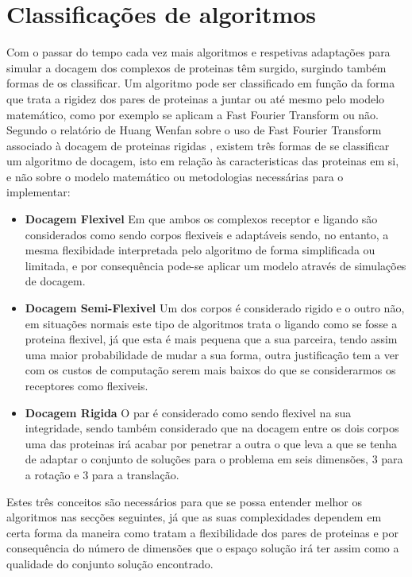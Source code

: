 


\section{Classificações de algoritmos}
\label{classi}
Com o passar do tempo cada vez mais algoritmos e respetivas adaptações para simular a docagem dos complexos de proteinas têm surgido, surgindo também formas de os classificar. Um algoritmo pode ser classificado em função da forma que trata a rigidez dos pares de proteinas a juntar ou até mesmo pelo modelo matemático, como por exemplo se aplicam a Fast Fourier Transform ou não.
Segundo o relatório de Huang Wenfan sobre o uso de Fast Fourier Transform associado à docagem de proteinas rigidas \cite{fftrigid}, existem três formas de se classificar um algoritmo de docagem, isto em relação às caracteristicas das proteinas em si, e não sobre o modelo matemático ou metodologias necessárias para o implementar:
\begin{itemize}
\item \textbf{Docagem Flexivel} Em que ambos os complexos receptor e ligando são considerados como sendo corpos flexiveis e adaptáveis sendo, no entanto, a mesma flexibidade interpretada pelo algoritmo de forma simplificada ou limitada, e por consequência pode-se aplicar um modelo através de simulações de docagem.
\item \textbf{Docagem Semi-Flexivel} Um dos corpos é considerado rigido e o outro não, em situações normais este tipo de algoritmos trata o ligando como se fosse a proteina flexivel, já que esta é mais pequena que a sua parceira, tendo assim uma maior probabilidade de mudar a sua forma, outra justificação tem a ver com os custos de computação serem mais baixos do que se considerarmos os receptores como flexiveis.
\item \textbf{Docagem Rigida} O par é considerado como sendo flexivel na sua integridade, sendo também considerado que na docagem entre os dois corpos uma das proteinas irá acabar por penetrar a outra o que leva a que se tenha de adaptar o conjunto de soluções para o problema em seis dimensões, 3 para a rotação e 3 para a translação.
\end{itemize}
Estes três conceitos são necessários para que se possa entender melhor os algoritmos nas secções seguintes, já que as suas complexidades dependem em certa forma da maneira como tratam a flexibilidade dos pares de proteinas e por consequência do número de dimensões que o espaço solução irá ter assim como a qualidade do conjunto solução encontrado.
